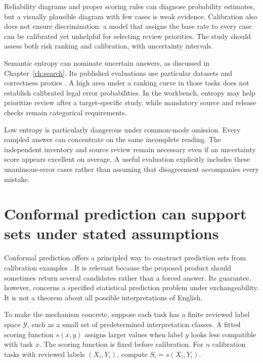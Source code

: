 
Reliability diagrams and proper scoring rules can diagnose probability estimates,
but a visually plausible diagram with few cases is weak evidence. Calibration
also does not ensure discrimination: a model that assigns the base rate to every
case can be calibrated yet unhelpful for selecting review priorities. The study
should assess both risk ranking and calibration, with uncertainty intervals.

Semantic entropy can nominate uncertain answers, as discussed in
Chapter~\ref{ch:search}. Its published evaluations use particular datasets and
correctness proxies \citep{semantic2023}. A high area under a ranking curve in
those tasks does not establish calibrated legal error probabilities. In the
workbench, entropy may help prioritize review after a target-specific study, while
mandatory source and release checks remain categorical requirements.

Low entropy is particularly dangerous under common-mode omission. Every sampled
answer can concentrate on the same incomplete reading. The independent inventory
and source review remain necessary even if an uncertainty score appears excellent
on average. A useful evaluation explicitly includes these unanimous-error cases
rather than assuming that disagreement accompanies every mistake.

\section{Conformal prediction can support sets under stated assumptions}
\label{merge:M09:09}


Conformal prediction offers a principled way to construct prediction sets from
calibration examples \citep[section 1.1 and appendix D]{conformal2022}. It is
relevant because the proposed product should sometimes return several candidates
rather than a forced answer. Its guarantee, however, concerns a specified
statistical prediction problem under exchangeability. It is not a theorem about
all possible interpretations of English.

To make the mechanism concrete, suppose each task has a finite reviewed label
space $\mathcal Y$, such as a small set of predetermined interpretation classes.
A fitted scoring function $s(x,y)$ assigns larger values when label $y$ looks less
compatible with task $x$. The scoring function is fixed before calibration.
For $n$ calibration tasks with reviewed labels $(X_i,Y_i)$, compute
$S_i=s(X_i,Y_i)$.

